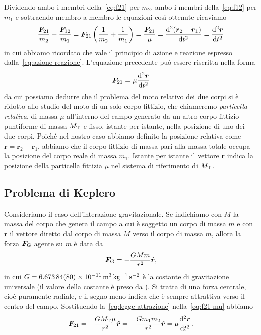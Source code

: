 Dividendo ambo i membri della~\eqref{eq:f21} per $m_2$, ambo i membri
della~\eqref{eq:f12} per $m_1$ e sottraendo membro a membro le equazioni così
ottenute ricaviamo
\begin{equation}
  \frac{\bm{F}_{21}}{m_2}-\frac{\bm{F}_{12}}{m_1} = \bm{F}_{21}
  \left(
    \frac{1}{m_2}+\frac{1}{m_1}
  \right) = \frac{\bm{F}_{21}}{\mu} = \toder[2]{(\bm{r}_2-\bm{r}_1)}{t} =
  \toder[2]{\bm{r}}{t}
\end{equation}
in cui abbiamo ricordato che vale il principio di azione e reazione espresso
dalla~\eqref{eq:azione-reazione}. L'equazione precedente può essere riscritta
nella forma
\begin{equation}
  \label{eq:f21-mu}
  \bm{F}_{21}=\mu\toder[2]{\bm{r}}{t}
\end{equation}
da cui possiamo dedurre che il problema del moto relativo dei due corpi si è
ridotto allo studio del moto di un solo corpo fittizio, che chiameremo
\emph{particella relativa}, di massa $\mu$ all'interno del campo generato da un
altro corpo fittizio puntiforme di massa $M_\textup{T}$ e fisso, istante per
istante, nella posizione di uno dei due corpi. Poiché nel nostro caso abbiamo
definito la posizione relativa come $\bm{r}=\bm{r}_2 - \bm{r}_1$, abbiamo che il
corpo fittizio di massa pari alla massa totale occupa la posizione del corpo
reale di massa $m_1$. Istante per istante il vettore $\bm{r}$ indica la
posizione della particella fittizia $\mu$ nel sistema di riferimento di
$M_\textup{T}$.

\subsection{Problema di Keplero}
\label{sec:problema-keplero}

Consideriamo il caso dell'interazione gravitazionale. Se indichiamo con $M$ la
massa del corpo che genera il campo a cui è soggetto un corpo di massa $m$ e con
$\bm{r}$ il vettore diretto dal corpo di massa $M$ verso il corpo di massa $m$,
allora la forza $\bm{F}_\textup{G}$ agente su $m$ è data da
\begin{equation}
  \label{eq:legge-attrazione}
  \bm{F}_\textup{G} = -\frac{GMm}{r^2}\versor{r},
\end{equation}
in cui $G=\SI{6.673
  84(80)e-11}{\cubic\metre\per\kilogram\per\second\squared}$ è la costante di
gravitazione universale (il valore della costante è preso da
\textcite{codata:costanti}). Si tratta di una forza centrale, cioè puramente
radiale, e il segno meno indica che è sempre attrattiva verso il centro del
campo. Sostituendo la~\eqref{eq:legge-attrazione} nella~\eqref{eq:f21-mu}
abbiamo
\begin{equation}
  \label{eq:forza-mu}
  \bm{F}_{21} = -\frac{GM_\textup{T}\mu}{r^2}\versor{r} =
  -\frac{Gm_1m_2}{r^2}\versor{r} = \mu\toder[2]{\bm{r}}{t}.
\end{equation}


